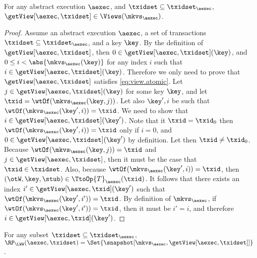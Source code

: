 \begin{proposition}
\label{prop:getview.valid}
For any abstract execution $\aexec$, and $\txidset \subseteq \txidset_{\aexec}$, 
$\getView[\aexec, \txidset] \in \Views(\mkvs_{\aexec})$.
\end{proposition}
\begin{proof}
Assume an abstract execution $\aexec$, a set of transactions $\txidset \subseteq \txidset_{\aexec}$, and a key \( \key \).
By the definition of $\getView[\aexec, \txidset]$, 
then $0 \in \getView[\aexec, \txidset](\key)$, and 
$0 \leq i < \abs{ \mkvs_{\aexec}(\key) }$ for any index \( i \) such that $i \in \getView[\aexec, \txidset](\key)$.
Therefore we only need to prove that $\getView[\aexec, \txidset]$ satisfies \eqref{eq:view.atomic}.
Let $j \in \getView[\aexec, \txidset](\key)$ for some key $\key$, and let $\txid = 
\wtOf(\mkvs_{\aexec}(\key, j))$. Let also $\key', i$ be such that 
$\wtOf(\mkvs_{\aexec}(\key', i)) = \txid$. We need to show that 
$i \in \getView[\aexec, \txidset](\key')$. Note that it $\txid = \txid_{0}$ 
then $\wtOf(\mkvs_{\aexec}(\key', i)) = \txid$ only if $i = 0$, and 
$0 \in \getView[\aexec, \txidset](\key')$ by definition. 
Let then $\txid \neq \txid_{0}$. Because $\wtOf(\mkvs_{\aexec}(\key, j)) = \txid$ 
and $j \in \getView[\aexec, \txidset]$, then it must be the case that $\txid \in \txidset$. 
Also, because $\wtOf(\mkvs_{\aexec}(\key', i)) = \txid$, then $(\otW, \key, \stub) \in 
\TtoOp{T}_{\aexec}(\txid)$. It follows that there exists an index $i' \in \getView[\aexec, \txid](\key')$ 
such that $\wtOf(\mkvs_{\aexec}(\key', i')) = \txid$. By definition of 
$\mkvs_{\aexec}$, if $\wtOf(\mkvs_{\aexec}(\key', i')) = \txid$, then it must 
be $i' = i$, and therefore $i \in \getView[\aexec, \txid](\key')$.
\end{proof}


\begin{proposition}
\label{prop:compatible.aexec2kv}
For any subset $\txidset \subseteq \txidset_{\aexec}$, $\RP_{\LWW}(\aexec, \txidset) = \Set{\snapshot[\mkvs_{\aexec}, \getView[\aexec, \txidset]]}$.
\end{proposition}

